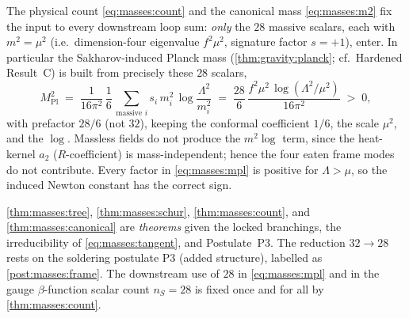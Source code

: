 The physical count \eqref{eq:masses:count} and the canonical mass
\eqref{eq:masses:m2} fix the input to every downstream loop sum: \emph{only}
the $28$ massive scalars, each with $m^{2}=\mu^{2}$ (i.e.\ dimension-four
eigenvalue $f^{2}\mu^{2}$, signature factor $s=+1$), enter. In particular the
Sakharov-induced Planck mass (\autoref{thm:gravity:planck}; cf.\ Hardened
Result~C) is built from precisely these $28$ scalars,
\begin{equation}\label{eq:masses:mpl}
  M_{\mathrm{Pl}}^{2}
  \;=\;
  \frac{1}{16\pi^{2}}\,\frac{1}{6}\,
  \sum_{\text{massive }i} s_{i}\,m_{i}^{2}\,\log\frac{\Lambda^{2}}{m_{i}^{2}}
  \;=\;
  \frac{28}{6}\,\frac{f^{2}\mu^{2}\,\log(\Lambda^{2}/\mu^{2})}{16\pi^{2}}
  \;>\;0,
\end{equation}
with prefactor $28/6$ (not $32$), keeping the conformal coefficient $1/6$, the
scale $\mu^{2}$, and the $\log$. Massless fields do not produce the $m^{2}\log$
term, since the heat-kernel $a_{2}$ ($R$-coefficient) is mass-independent;
hence the four eaten frame modes do not contribute. Every factor in
\eqref{eq:masses:mpl} is positive for $\Lambda>\mu$, so the induced Newton
constant has the correct sign.

\begin{remark}[Status]\label{rmk:masses:status}
\autoref{thm:masses:tree}, \autoref{thm:masses:schur},
\autoref{thm:masses:count}, and \autoref{thm:masses:canonical} are
\emph{theorems} given the locked branchings, the irreducibility of
\eqref{eq:masses:tangent}, and Postulate~P3. The reduction $32\to 28$ rests on
the soldering postulate P3 (added structure), labelled as
\autoref{post:masses:frame}. The downstream
use of $28$ in \eqref{eq:masses:mpl} and in the gauge $\beta$-function scalar
count $n_{S}=28$ is fixed once and for all by \autoref{thm:masses:count}.
\end{remark}
